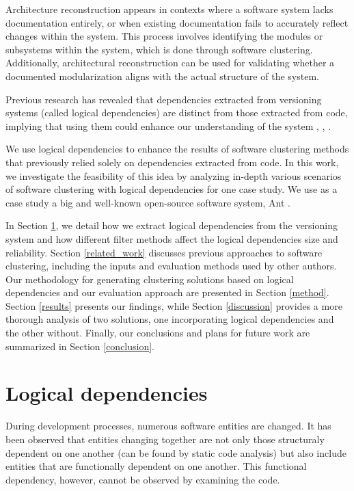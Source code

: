 \documentclass[conference]{IEEEtran}
\begin{document}
Architecture reconstruction appears in contexts where a software system lacks documentation entirely, or when existing documentation fails to accurately reflect changes within the system. This process involves identifying the modules or subsystems within the system, which is done through software clustering. Additionally, architectural reconstruction can be used for validating whether a documented modularization aligns with the actual structure of the system.

Previous research has revealed that dependencies extracted from versioning systems (called logical dependencies) are distinct from those extracted from code, implying that using them could enhance our understanding of the system \cite{DBLP:conf/issre/OlivaG15}, \cite{DBLP:journals/jss/AjienkaC17}, \cite{Oliva:2011:ISL:2067853.2068086}.

We use logical dependencies to enhance the results of software clustering methods that previously relied solely on dependencies extracted from code. In this work, we investigate the feasibility of this idea by analyzing in-depth various scenarios of software clustering with logical dependencies for one case study. We use as a case study a big and well-known open-source software system, Ant \cite{ApacheAntGitHub}.

In Section \ref{ld_def}, we detail how we extract logical dependencies from the versioning system and how different filter methods affect the logical dependencies size and reliability. Section \ref{related_work} discusses previous approaches to software clustering, including the inputs and evaluation methods used by other authors. Our methodology for generating clustering solutions based on logical dependencies and our evaluation approach are presented in Section \ref{method}. Section \ref{results} presents our findings, while Section \ref{discussion} provides a more thorough analysis of two solutions, one incorporating logical dependencies and the other without. Finally, our conclusions and plans for future work are summarized in Section \ref{conclusion}.


\section{Logical dependencies}
\label{ld_def}

During development processes, numerous software entities are changed. It has been observed that entities changing together are not only those structuraly dependent on one another (can be found by static code analysis) but also include entities that are functionally dependent on one another. This functional dependency, however, cannot be observed by examining the code.
\end{document}
